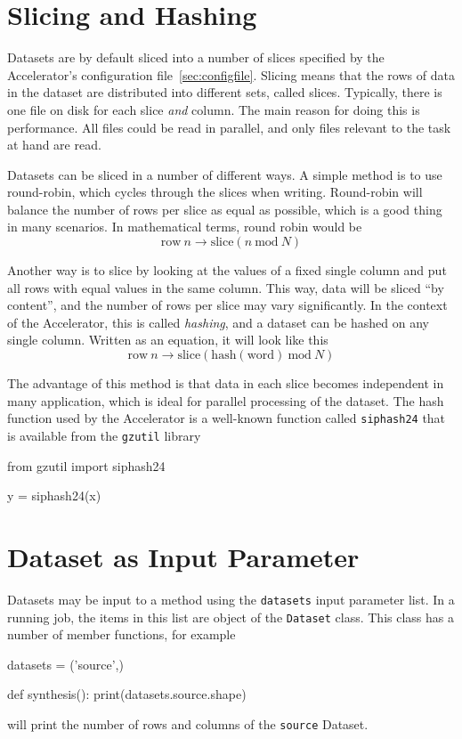 \section{Slicing and Hashing}
\label{sec:slicing_and_hashing}

Datasets are by default sliced into a number of slices specified by
the Accelerator's configuration file~\ref{sec:configfile}.  Slicing means that the
rows of data in the dataset are distributed into different sets,
called slices.  Typically, there is one file on disk for each slice
\textsl{and} column.  The main reason for doing this is performance.  All files
could be read in parallel, and only files relevant to the task at hand
are read.

Datasets can be sliced in a number of different ways.  A simple method
is to use round-robin, which cycles through the slices when writing.
Round-robin will balance the number of rows per slice as equal as
possible, which is a good thing in many scenarios.  In mathematical
terms, round robin would be
\begin{equation*}
  \textrm{row}~n \longrightarrow \textrm{slice}(n~\textrm{mod}~N)
\end{equation*}

Another way is to slice by looking at the values of a fixed single
column and put all rows with equal values in the same column.  This
way, data will be sliced ``by content'', and the number of rows per
slice may vary significantly.  In the context of the Accelerator, this
is called \emph{hashing}, and a dataset can be hashed on any single
column.  Written as an equation, it will look like this
\begin{equation*}
\textrm{row}~n \longrightarrow \textrm{slice}(\textrm{hash}(\textrm{word})~\textrm{mod}~N)
\end{equation*}

The advantage of this method is that data in each slice becomes
independent in many application, which is ideal for parallel
processing of the dataset.  The hash function used by the Accelerator
is a well-known function called \texttt{siphash24} that is available
from the \texttt{gzutil} library
\begin{python}
from gzutil import siphash24

y = siphash24(x)
\end{python}



\section{Dataset as Input Parameter}
Datasets may be input to a method using the \texttt{datasets} input
parameter list.  In a running job, the items in this list are object
of the \texttt{Dataset} class.  This class has a number of member
functions, for example
\begin{python}
datasets = ('source',)

def synthesis():
  print(datasets.source.shape)
\end{python}
will print the number of rows and columns of the \texttt{source}
Dataset.


